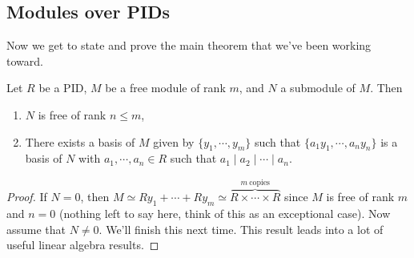 \subsection{Modules over PIDs}
Now we get to state and prove the main theorem that we've been working toward.
\begin{theorem}
   Let $R$ be a PID, $M$ be a free module of rank $m$, and $N$ a submodule of $M$. Then 
   \begin{enumerate}[label=\arabic*)]
       \item $N$ is free of rank $n\leq m$,
       \item There exists a basis of $M $ given by  $\{y_1,\cdots ,y_m\} $ such that $\{a_1y_1,\cdots ,a_n y_n \} $ is a basis of $N$ with $a_1,\cdots ,a_n \in R$ such that $a_1 \mid a_2 \mid \cdots  \mid a_n $.
   \end{enumerate}
\end{theorem}
\begin{proof}
    If $N=0$, then $M\simeq Ry_1+\cdots +Ry_m\simeq \overset{m \ \text{copies} }{\overbrace{R\times \cdots \times R}} $ since $M$ is free of rank $m$ and $n=0$ (nothing left to say here, think of this as an exceptional case). Now assume that $N\neq 0$. We'll finish this next time. This result leads into a lot of useful linear algebra results.
\end{proof}
